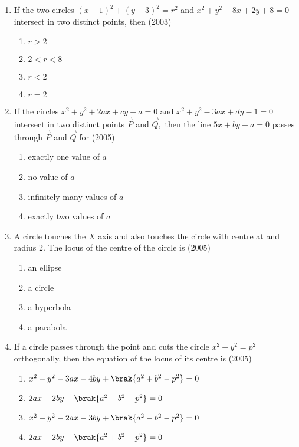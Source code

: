\begin{enumerate}
\item If the two circles $(x-1)^2+(y-3)^2=r^2$ and $x^2+y^2-8x+2y+8=0$ intersect in two distinct points,  then \hfill(2003)
\begin{multicols}{2}
\begin{enumerate}
\item$r>2$
\item$2<r<8$
\item$r<2$
\item$r=2$
\end{enumerate}
\end{multicols}
\item If the circles $x^2+y^2+2ax+cy+a=0$ and $x^2+y^2-3ax+dy-1=0$ intersect in two distinct points $\vec{P}$ and $\vec{Q},$ then the line $5x+by-a=0$ passes through $\vec{P}$ and $\vec{Q}$ for
\hfill{(2005)}
\begin{multicols}{2}
\begin{enumerate}
\item exactly one value of $a$
\item no value of $a$
\item infinitely many values of $a$
\item exactly two values of $a$
\end{enumerate}
\end{multicols}
\item A circle touches the $X$ axis and also touches the circle with centre at  and radius 2. The locus of the centre of the circle is
\hfill{(2005)}
\begin{multicols}{2}
\begin{enumerate}
\item an ellipse
\item a circle 
\item a hyperbola
\item a parabola
\end{enumerate}
\end{multicols}
\item If a circle passes through the point  and cuts the circle $x^2+y^2=p^2$ orthogonally,  then the equation of the locus of its centre is 
\hfill{(2005)}
\begin{multicols}{2}
\begin{enumerate}
\item $x^2+y^2-3ax-4by+\brak{a^2+b^2-p^2}=0$
\item $2ax+2by-\brak{a^2-b^2+p^2}=0$
\item $x^2+y^2-2ax-3by+\brak{a^2-b^2-p^2}=0$
\item $2ax+2by-\brak{a^2+b^2+p^2}=0$

\end{enumerate}
\end{multicols}
\end{enumerate}

